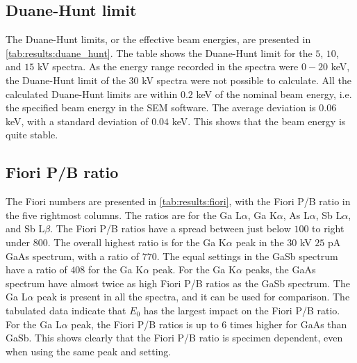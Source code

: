 \subsection{Duane-Hunt limit}
\label{results:duane_hunt}

The Duane-Hunt limits, or the effective beam energies, are presented in \cref{tab:results:duane_hunt}.
The table shows the Duane-Hunt limit for the $5$, $10$, and $15$ kV spectra.
As the energy range recorded in the spectra were $0-20$ keV, the Duane-Hunt limit of the $30$ kV spectra were not possible to calculate.
All the calculated Duane-Hunt limits are within $0.2$ keV of the nominal beam energy, i.e. the specified beam energy in the SEM software.
The average deviation is $0.06$ keV, with a standard deviation of $0.04$ keV.
This shows that the beam energy is quite stable.





\subsection{Fiori P/B ratio}
\label{results:fiori}

The Fiori numbers are presented in \cref{tab:results:fiori}, with the Fiori P/B ratio in the five rightmost columns.
The ratios are for the Ga L$\alpha$, Ga K$\alpha$, As L$\alpha$, Sb L$\alpha$, and Sb L$\beta$.
The Fiori P/B ratios have a spread between just below $100$ to right under $800$.
The overall highest ratio is for the Ga K$\alpha$ peak in the $30$ kV $25$ pA GaAs spectrum, with a ratio of $770$.
The equal settings in the GaSb spectrum have a ratio of $408$ for the Ga K$\alpha$ peak.
For the Ga K$\alpha$ peaks, the GaAs spectrum have almost twice as high Fiori P/B ratios as the GaSb spectrum.
The Ga L$\alpha$ peak is present in all the spectra, and it can be used for comparison.
The tabulated data indicate that $E_0$ has the largest impact on the Fiori P/B ratio.
For the Ga L$\alpha$ peak, the Fiori P/B ratios is up to $6$ times higher for GaAs than GaSb.
This shows clearly that the Fiori P/B ratio is specimen dependent, even when using the same peak and setting.



